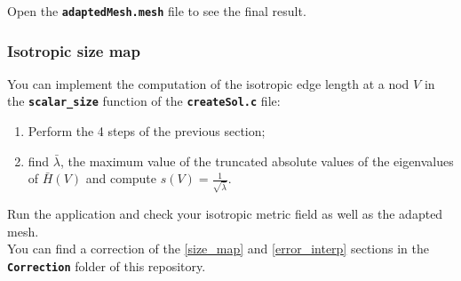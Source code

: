 \documentclass{article}
\newcommand{\ttb}[1]{\texttt{\textbf{#1}}}
\begin{document}
Open the \ttb{adaptedMesh.mesh} file to see the final result.

\subsubsection{Isotropic size map}
You can implement the computation of the isotropic edge length at a
nod $V$ in the \ttb{scalar\_size} function of the \ttb{createSol.c}
file:

\begin{enumerate}
\item Perform the 4 steps of the previous section;
\item find $\bar{\lambda}$, the maximum value of the truncated absolute values
  of the eigenvalues of $\bar{H}(V)$ and compute
  $ s(V) = \frac{1}{\sqrt{\bar{\lambda}}}$.
\end{enumerate}
Run the application and check your isotropic metric
field as well as the adapted mesh.\\

You can find a correction of the \ref{size_map} and
\ref{error_interp} sections in the \ttb{Correction} folder of this repository.
\end{document}
